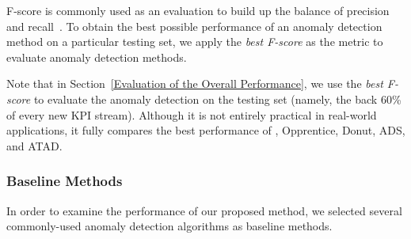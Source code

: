 F-score is commonly used as an evaluation to build up the balance of precision and recall~\cite{atad}. To obtain the best possible performance of an anomaly detection method on a particular testing set, we apply the \emph{best F-score} as the metric to evaluate anomaly detection methods.

Note that in Section~\ref{Evaluation of the Overall Performance}, we use the \emph{best F-score} to evaluate the anomaly detection on the testing set (namely, the back 60\% of every new KPI stream). Although it is not entirely practical in real-world applications, it fully compares the best performance of \name{}, Opprentice, Donut, ADS, and ATAD.

\subsubsection{Baseline Methods}
\label{Baseline methods}
In order to examine the performance of our proposed method, we selected several commonly-used anomaly detection algorithms as baseline methods. 
